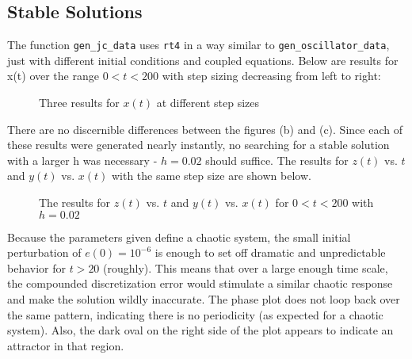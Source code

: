 \documentclass[12pt]{article}
\begin{document}
\subsection{Stable Solutions}
The function \texttt{gen\_jc\_data} uses \texttt{rt4} in a way similar to \texttt{gen\_oscillator\_data}, just with different initial conditions and coupled equations. Below are results for x(t) over the range $0 < t < 200$ with step sizing decreasing from left to right:
\begin{figure}[H]
 \qquad
{} \qquad
{} \qquad
\caption{Three results for $x(t)$ at different step sizes}
\end{figure}
There are no discernible differences between the figures (b) and (c). Since each of these results were generated nearly instantly, no searching for a stable solution with a larger h was necessary - $h = 0.02$ should suffice. The results for $z(t)$ vs. $t$ and $y(t)$ vs. $x(t)$ with the same step size are shown below.
\begin{figure}[H]
 \qquad{}
\caption{The results for $z(t)$ vs. $t$ and $y(t)$ vs. $x(t)$ for $0 < t < 200$ with $h = 0.02$}
\end{figure}
Because the parameters given define a chaotic system, the small initial perturbation of $e(0) = 10^{-6}$ is enough to set off dramatic and unpredictable behavior for $t > 20$ (roughly). This means that over a large enough time scale, the compounded discretization error would stimulate a similar chaotic response and make the solution wildly inaccurate. The phase plot does not loop back over the same pattern, indicating there is no periodicity (as expected for a chaotic system). Also, the dark oval on the right side of the plot appears to indicate an attractor in that region.
\end{document}
